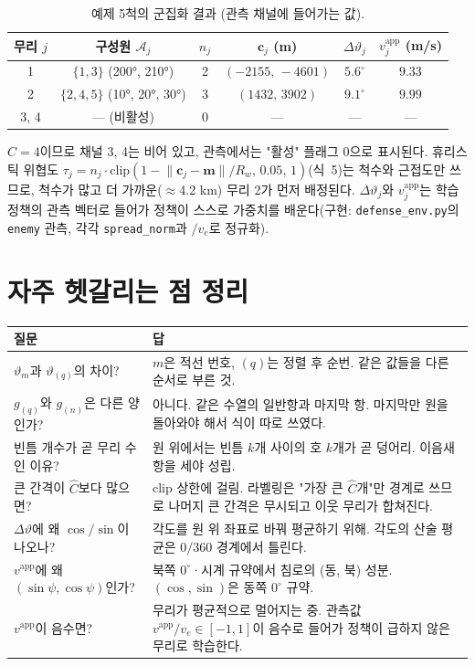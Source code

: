 \documentclass[11pt,a4paper]{article}
\newcommand{\vt}{\vartheta}
\newcommand{\bfm}{\mathbf{m}}
\newcommand{\bfc}{\mathbf{c}}
\newcommand{\vapp}{v^{\mathrm{app}}}
\begin{document}
\begin{table}[H]
\centering\small
\caption{예제 5척의 군집화 결과 (관측 채널에 들어가는 값).}
\begin{tabular}{c c c c c c}
\toprule
무리 $j$ & 구성원 $\mathcal A_j$ & $n_j$ & $\bfc_j$ (m) & $\Delta\vt_j$ & $\vapp_j$ (m/s) \\
\midrule
1 & $\{1, 3\}$ (200°, 210°) & 2 & $(-2155,\,-4601)$ & $5.6^\circ$ & $9.33$ \\
2 & $\{2, 4, 5\}$ (10°, 20°, 30°) & 3 & $(1432,\,3902)$ & $9.1^\circ$ & $9.99$ \\
3, 4 & --- (비활성) & 0 & --- & --- & --- \\
\bottomrule
\end{tabular}
\end{table}
$C=4$이므로 채널 3, 4는 비어 있고, 관측에서는 "활성" 플래그 0으로 표시된다.
휴리스틱 위협도 $\tau_j = n_j\cdot\mathrm{clip}(1-\lVert\bfc_j-\bfm\rVert/R_w,\,0.05,\,1)$(식~5)는 척수와 근접도만 쓰므로, 척수가 많고 더 가까운($\approx$4.2 km) 무리 2가 먼저 배정된다. $\Delta\vt_j$와 $\vapp_j$는 학습 정책의 관측 벡터로 들어가 정책이 스스로 가중치를 배운다(구현: \texttt{defense\_env.py}의 \texttt{enemy} 관측, 각각 \texttt{spread\_norm}과 $/v_e$로 정규화).

\section{자주 헷갈리는 점 정리}

\begin{table}[H]
\centering\small
\begin{tabular}{p{} p{}}
\toprule
질문 & 답 \\
\midrule
$\vt_m$과 $\vt_{(q)}$의 차이? & $m$은 적선 번호, $(q)$는 정렬 후 순번. 같은 값들을 다른 순서로 부른 것. \\
$g_{(q)}$와 $g_{(n)}$은 다른 양인가? & 아니다. 같은 수열의 일반항과 마지막 항. 마지막만 원을 돌아와야 해서 식이 따로 쓰였다. \\
빈틈 개수가 곧 무리 수인 이유? & 원 위에서는 빈틈 $k$개 사이의 호 $k$개가 곧 덩어리. 이음새 항을 세야 성립. \\
큰 간격이 $\hat C$보다 많으면? & clip 상한에 걸림. 라벨링은 "가장 큰 $\hat C$개"만 경계로 쓰므로 나머지 큰 간격은 무시되고 이웃 무리가 합쳐진다. \\
$\Delta\vt$에 왜 $\cos/\sin$이 나오나? & 각도를 원 위 좌표로 바꿔 평균하기 위해. 각도의 산술 평균은 $0/360$ 경계에서 틀린다. \\
$\vapp$에 왜 $(\sin\psi, \cos\psi)$인가? & 북쪽 $0^\circ$·시계 규약에서 침로의 (동, 북) 성분. $(\cos,\sin)$은 동쪽 $0^\circ$ 규약. \\
$\vapp$이 음수면? & 무리가 평균적으로 멀어지는 중. 관측값 $\vapp/v_e \in [-1, 1]$이 음수로 들어가 정책이 급하지 않은 무리로 학습한다. \\
\bottomrule
\end{tabular}
\end{table}
\end{document}
